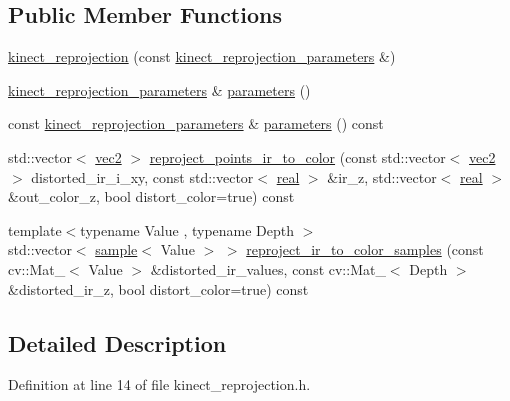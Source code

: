 \subsection*{Public Member Functions}
\begin{DoxyCompactItemize}
\item 
\hyperlink{classtlz_1_1kinect__reprojection_a172adb65033a3dbb99c9515b5b877871}{kinect\+\_\+reprojection} (const \hyperlink{structtlz_1_1kinect__reprojection__parameters}{kinect\+\_\+reprojection\+\_\+parameters} \&)
\item 
\hyperlink{structtlz_1_1kinect__reprojection__parameters}{kinect\+\_\+reprojection\+\_\+parameters} \& \hyperlink{classtlz_1_1kinect__reprojection_ab8b19da78edaa6a044b34f39960804b7}{parameters} ()
\item 
const \hyperlink{structtlz_1_1kinect__reprojection__parameters}{kinect\+\_\+reprojection\+\_\+parameters} \& \hyperlink{classtlz_1_1kinect__reprojection_a896a8e25965b184f6ce9f30d5d1aaf88}{parameters} () const 
\item 
std\+::vector$<$ \hyperlink{namespacetlz_ae192989bfbe6c700ac84d2a8cf05ebb4}{vec2} $>$ \hyperlink{classtlz_1_1kinect__reprojection_a15890a47741e1be6217d2870ecbe3f5a}{reproject\+\_\+points\+\_\+ir\+\_\+to\+\_\+color} (const std\+::vector$<$ \hyperlink{namespacetlz_ae192989bfbe6c700ac84d2a8cf05ebb4}{vec2} $>$ distorted\+\_\+ir\+\_\+i\+\_\+xy, const std\+::vector$<$ \hyperlink{namespacetlz_a15fd37cce97f2b8b606af18c2615f602}{real} $>$ \&ir\+\_\+z, std\+::vector$<$ \hyperlink{namespacetlz_a15fd37cce97f2b8b606af18c2615f602}{real} $>$ \&out\+\_\+color\+\_\+z, bool distort\+\_\+color=true) const 
\item 
{\footnotesize template$<$typename Value , typename Depth $>$ }\\std\+::vector$<$ \hyperlink{classtlz_1_1kinect__reprojection_afe84b47774e13076ec08d9d5376262d7}{sample}$<$ Value $>$ $>$ \hyperlink{classtlz_1_1kinect__reprojection_a0e55570a8afb6c70598495ea716e1dfe}{reproject\+\_\+ir\+\_\+to\+\_\+color\+\_\+samples} (const cv\+::\+Mat\+\_\+$<$ Value $>$ \&distorted\+\_\+ir\+\_\+values, const cv\+::\+Mat\+\_\+$<$ Depth $>$ \&distorted\+\_\+ir\+\_\+z, bool distort\+\_\+color=true) const 
\end{DoxyCompactItemize}


\subsection{Detailed Description}


Definition at line 14 of file kinect\+\_\+reprojection.\+h.



